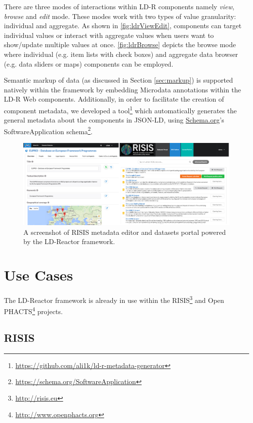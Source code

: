 \documentclass{acm_proc_article-sp}
\begin{document}
There are three modes of interactions within LD-R components namely \emph{view}, \emph{browse} and \emph{edit} mode.
These modes work with two types of value granularity: individual and aggregate.
As shown in \autoref{fig:ldrViewEdit}, components can target individual values or interact with aggregate values when users want to show/update multiple values at once.
\autoref{fig:ldrBrowse} depicts the browse mode where individual (e.g. item lists with check boxes) and aggregate data browser (e.g. data sliders or maps) components can be employed.

Semantic markup of data (as discussed in Section \ref{sec:markup}) is supported natively within the framework by embedding Microdata annotations within the LD-R Web components.
Additionally, in order to facilitate the creation of component metadata, we developed a tool\footnote{\url{https://github.com/ali1k/ld-r-metadata-generator}} which automatically generates the general metadata about the components in JSON-LD, using \url{Schema.org}'s SoftwareApplication schema\footnote{\url{https://schema.org/SoftwareApplication}}.

\begin{figure}[ht] 
  \includegraphics[width=1\linewidth]{images/screenshots.jpg}
  \caption{A screenshot of RISIS metadata editor and datasets portal powered by the LD-Reactor framework.}
  \label{fig:risisScreenshot}
\end{figure}

\section{Use Cases}

The LD-Reactor framework is already in use within the RISIS\footnote{\url{http://risis.eu}} and Open PHACTS\footnote{\url{http://www.openphacts.org}} projects.

\subsection{RISIS}
\end{document}
